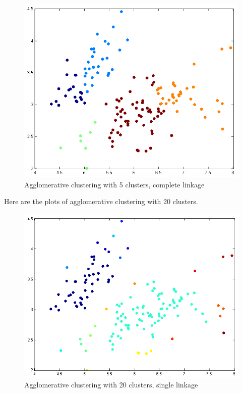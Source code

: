 \documentclass[twoside,11pt]{article}
\theoremstyle{definition}
\begin{document}
\newpage

\begin{figure}[h]
\centering
\includegraphics[width=6 in]{prob1PartC_2.png}
\caption{Agglomerative clustering with 5 clusters, complete linkage}
\end{figure}

\newpage

Here are the plots of agglomerative clustering with 20 clusters.  
\begin{figure}[h]
\centering
\includegraphics[width=6 in]{prob1PartC_3.png}
\caption{Agglomerative clustering with 20 clusters, single linkage}
\end{figure}
\end{document}
